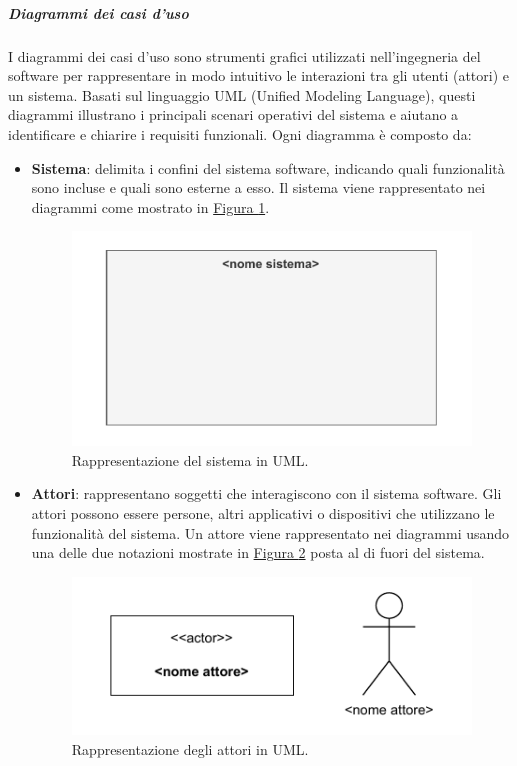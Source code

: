 \subparagraph{Diagrammi dei casi d'uso}
I diagrammi dei casi d'uso sono strumenti grafici utilizzati nell'ingegneria del software per rappresentare in modo intuitivo le interazioni tra gli utenti (attori) e un sistema. Basati sul linguaggio UML (Unified Modeling Language), questi diagrammi illustrano i principali scenari operativi del sistema e aiutano a identificare e chiarire i requisiti funzionali.
Ogni diagramma è composto da:
\begin{itemize}
    \item \textbf{Sistema}: delimita i confini del sistema software, indicando quali funzionalità sono incluse e quali sono esterne a esso.
    Il sistema viene rappresentato nei diagrammi come mostrato in \hyperref[fig:sistema_uml]{Figura \ref{fig:sistema_uml}}.
    \begin{figure}[!h]
        \centering
        \includegraphics{Sezioni/ProcessiPrimari/Immagini/sistema_caso_uso.pdf}
        \caption{Rappresentazione del sistema in UML.}
        \label{fig:sistema_uml}
    \end{figure}
    
    \item \textbf{Attori}: rappresentano soggetti che interagiscono con il sistema software. Gli attori possono essere persone, altri applicativi o dispositivi che utilizzano le funzionalità del sistema.
    Un attore viene rappresentato nei diagrammi usando una delle due notazioni mostrate in \hyperref[fig:attori_uml]{Figura \ref{fig:attori_uml}} posta al di fuori del sistema.
    \begin{figure}[!h]
        \centering
        \includegraphics{Sezioni/ProcessiPrimari/Immagini/attori_caso_uso.pdf}
        \caption{Rappresentazione degli attori in UML.}
        \label{fig:attori_uml}
    \end{figure}
    

\end{itemize}
